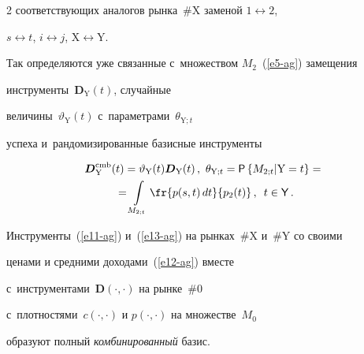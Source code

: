 \begin{multicols}{2}
со\-от\-вет\-ст\-ву\-ющих аналогов рынка~\#X заменой $1\leftrightarrow2$, 


$s\leftrightarrow t$, $i\leftrightarrow j$, $\mathrm{X}\leftrightarrow\mathrm{Y}$. 


Так определяются уже связанные с~множеством $M_2$~(\ref{e5-ag}) замещения 


инструменты~$\boldsymbol{D}_{\mathrm{Y}}(t)$, случайные 


величины~$\vartheta_{\mathrm{Y}}(t)$ с~па\-ра\-мет\-ра\-ми~$\theta_{\mathrm{Y};t}$ 


успеха и~рандомизированные базисные инструменты 





\noindent


  \begin{multline}


  \boldsymbol{D}^{\mathrm{cmb}}_{\mathrm{Y}}(t)=\vartheta_{\mathrm{Y}}(t) 


\boldsymbol{D}_{\mathrm{Y}}(t)\,,\


  \theta_{\mathrm{Y};t} ={\sf P}\left\{ M_{2;t}\vert \mathrm{Y}=t\right\} 


={}\\


{}=\int\limits_{M_{2;t}} \fr{p(s,t)\,dt}{p_2(t)}\,,\enskip t\in{\sf Y}\,.


  \label{e13-ag}


  \end{multline}


  


  Инструменты~(\ref{e11-ag}) и~(\ref{e13-ag}) на рынках~\#X и~\#Y со своими 


ценами и средними доходами~(\ref{e12-ag}) вместе\linebreak\vspace*{-12pt}





\pagebreak





\noindent 


с~инструментами~$\boldsymbol{D}(\cdot,\cdot)$ на рынке~\#0 


с~плотностями~$c(\cdot,\cdot)$ и $p(\cdot,\cdot)$ на множестве~$M_0$ 


образуют полный \textit{комбинированный} базис. 



\end{multicols}
